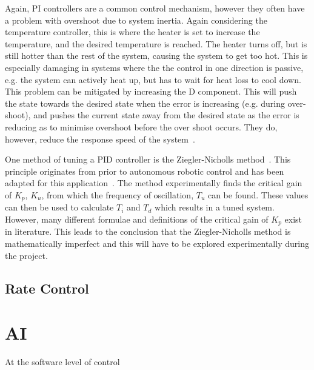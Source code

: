 Again, PI controllers are a common control mechanism, however they often have a problem with overshoot due to system inertia. Again considering the temperature controller, this is where the heater is set to increase the temperature, and the desired temperature is reached. The heater turns off, but is still hotter than the rest of the system, causing the system to get too hot. This is especially damaging in systems where the the control in one direction is passive, e.g. the system can actively heat up, but has to wait for heat loss to cool down. This problem can be mitigated by increasing the D component. This will push the state towards the desired state when the error is increasing (e.g. during over-shoot), and pushes the current state away from the desired state as the error is reducing as to minimise overshoot before the over shoot occurs. They do, however, reduce the response speed of the system~\cite{chen2007linear}.

One method of tuning a PID controller is the Ziegler-Nicholls method~\cite{ziegler1942optimum}. This principle originates from prior to autonomous robotic control and has been adapted for this application~\cite{aastrom2004revisiting}. The method experimentally finds the critical gain of $K_p$, $K_u$, from which the frequency of oscillation, $T_u$ can be found. These values can then be used to calculate $T_i$ and $T_d$ which results in a tuned system. However, many different formulae and definitions of the critical gain of $K_p$ exist in literature. This leads to the conclusion that the Ziegler-Nicholls method is mathematically imperfect and this will have to be explored experimentally during the project.     

\subsection{Rate Control}\label{litreview/robotics/ratecontrol}


\section{AI}\label{litreview/ai}
At the software level of control 


